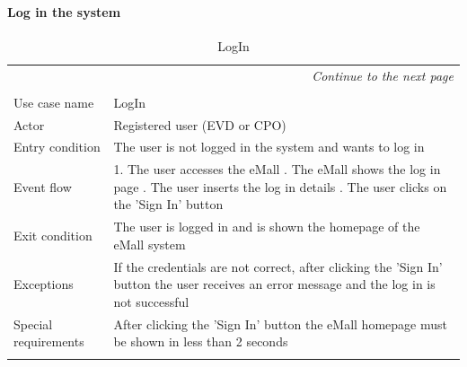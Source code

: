 \paragraph{Log in the system}
\begin{center}
    \begin{longtable}{p{4cm} p{11cm}}
    \multicolumn{2}{r}{\itshape{Continue to the next page}}\\
    \endfoot 
    \\
    \endlastfoot
    \hline
     Use case name &  LogIn\\
     \hline
     Actor & Registered user (EVD or CPO)\\
     \hline
     Entry condition &  The user is not logged in the system and wants to log in\\
     \hline
     Event flow &   1. The user accesses the eMall \newline
                    2. The eMall shows the log in page \newline
                    3. The user inserts the log in details \newline
                    4. The user clicks on the 'Sign In' button \\
     \hline
     Exit condition & The user is logged in and is shown the homepage of the eMall system \\
     \hline
     Exceptions &  If the credentials are not correct, after clicking the 'Sign In' button the user receives an error message and the log in is not successful \\
     \hline
     Special requirements &  After clicking the 'Sign In' button the eMall homepage must be shown in less than 2 seconds \\
     \hline
    \caption{LogIn}
    \label{tab:LogIn}
    \end{longtable}
\end{center}

